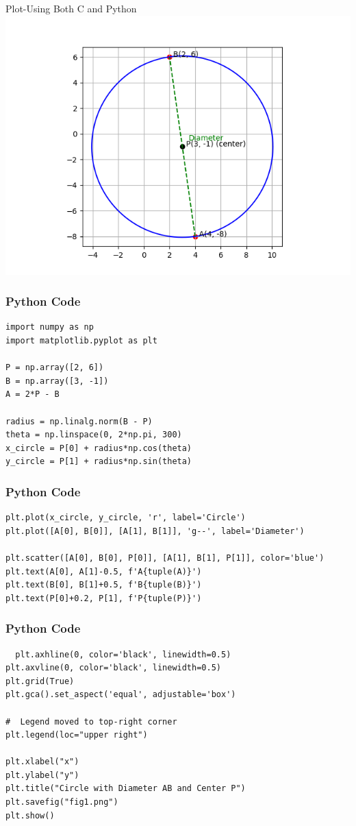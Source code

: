 \documentclass{beamer}
\begin{document}
\begin{frame}{Plot-Using Both C and Python}
    \centering
    \includegraphics[width=\columnwidth, height=0.8\textheight, keepaspectratio]{figs/fig1.2.png}     
\end{frame}
\begin{frame}[fragile]
    \frametitle{Python Code}
    \begin{lstlisting}
import numpy as np
import matplotlib.pyplot as plt

P = np.array([2, 6])
B = np.array([3, -1])
A = 2*P - B

radius = np.linalg.norm(B - P)
theta = np.linspace(0, 2*np.pi, 300)
x_circle = P[0] + radius*np.cos(theta)
y_circle = P[1] + radius*np.sin(theta)
\end{lstlisting}
\end{frame}
\begin{frame}[fragile]
    \frametitle{Python Code}
    \begin{lstlisting}
plt.plot(x_circle, y_circle, 'r', label='Circle') 
plt.plot([A[0], B[0]], [A[1], B[1]], 'g--', label='Diameter')

plt.scatter([A[0], B[0], P[0]], [A[1], B[1], P[1]], color='blue')
plt.text(A[0], A[1]-0.5, f'A{tuple(A)}')
plt.text(B[0], B[1]+0.5, f'B{tuple(B)}')
plt.text(P[0]+0.2, P[1], f'P{tuple(P)}')
\end{lstlisting}
\end{frame}

\begin{frame}[fragile]
    \frametitle{Python Code}
    \begin{lstlisting}
  plt.axhline(0, color='black', linewidth=0.5)
plt.axvline(0, color='black', linewidth=0.5)
plt.grid(True)
plt.gca().set_aspect('equal', adjustable='box')

#  Legend moved to top-right corner
plt.legend(loc="upper right")

plt.xlabel("x")
plt.ylabel("y")
plt.title("Circle with Diameter AB and Center P")
plt.savefig("fig1.png")
plt.show()  
\end{lstlisting}
\end{frame}
\end{document}
